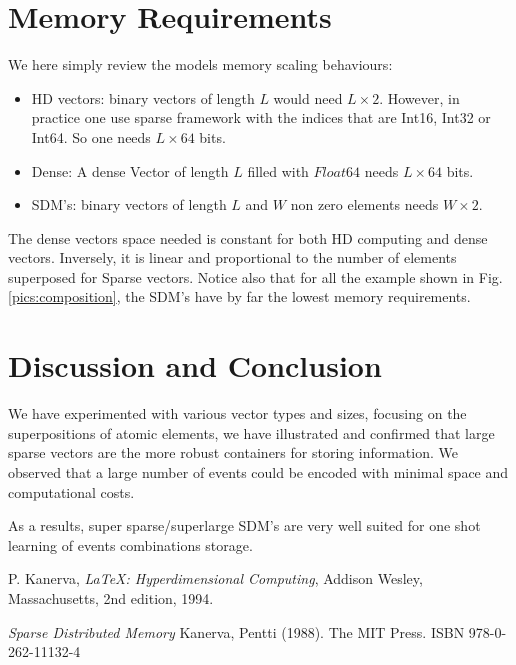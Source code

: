 \documentclass[11pt]{article}
\begin{document}
\section{Memory Requirements}
We here simply review the models memory scaling behaviours:
\begin{itemize}
\item HD vectors: binary vectors of length $L$ would need  $L \times 2$. However, in practice one use sparse framework with the indices
that are Int16, Int32 or Int64. So one needs $L \times 64$ bits.
\item Dense: A dense Vector of length $L$ filled with $Float64$ needs $L \times 64$ bits.
\item SDM's: binary vectors of length $L$ and $W$ non zero elements needs $W \times 2$.
\end{itemize}
The dense vectors space needed is constant for both HD computing and dense vectors. Inversely, it is linear and proportional to the number of elements superposed for Sparse vectors. 
Notice also that for all the example shown in Fig.\ref{pics:composition}, the SDM's have by far the lowest memory requirements.

\section{Discussion and Conclusion}
We have experimented with various 
vector types and sizes, focusing on the superpositions of atomic elements, we have illustrated and confirmed that large sparse vectors are the more robust containers for storing information. We observed that a large number of events could be encoded with minimal space and computational costs.

 As a results, super sparse/superlarge SDM's are very well suited for one shot learning of events combinations storage. 




\begin{thebibliography}{9}

  P. Kanerva,
  \textit{\LaTeX: Hyperdimensional Computing},
  Addison Wesley, Massachusetts,
  2nd edition,
  1994.
 

 \textit{Sparse Distributed Memory}
 Kanerva, Pentti (1988).  The MIT Press. ISBN 978-0-262-11132-4

\end{thebibliography}
\end{document}
